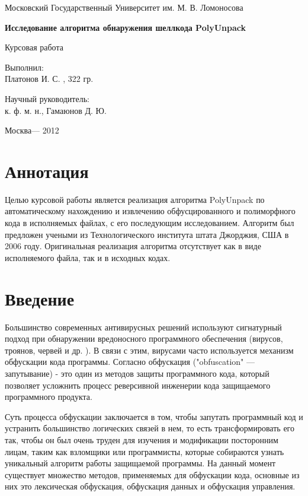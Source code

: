 \documentclass[oneside, final, 14pt]{extreport}
\begin{document}
\centerline{Московский Государственный Университет им. М. В. Ломоносова}
\centerline{\hfill\hrulefill\hrulefill\hfill}
\vfill
\vfill
\vfill
\large
\vfill
\Large
\begin{centering}
{\bf Исследование алгоритма обнаружения шеллкода PolyUnpack\\}
\end{centering}
\normalsize
\vfill
\centerline{Курсовая работа}
\vfill
\vfill
\begin{flushright}
Выполнил:\\ Платонов И. С. , 322 гр.
\end{flushright}

\begin{flushright}
Научный руководитель:\\
к. ф. м. н., Гамаюнов Д. Ю.
\end{flushright}
\vfill
\vfill
\centerline{Москва--- 2012}








\tableofcontents




\chapter{Аннотация}

Целью курсовой работы является реализация алгоритма PolyUnpack \cite{Poly} по автоматическому нахождению и извлечению обфусцированного и полиморфного кода в исполняемых файлах, с его последующим исследованием. Алгоритм был предложен учеными из Технологического института штата Джорджия, США в 2006 году.  Оригинальная реализация алгоритма отсутствует как в виде исполняемого файла, так и в исходных кодах.

\chapter{Введение}

Большинство современных антивирусных решений используют сигнатурный подход при обнаружении вредоносного программного обеспечения (вирусов, троянов, червей и др. ). В связи с этим, вирусами часто используется механизм обфускации кода программы. Согласно \cite{Obphys} обфускация ("obfuscation" — запутывание) - это один из методов защиты программного кода, который позволяет усложнить процесс реверсивной инженерии кода защищаемого программного продукта. 

Суть процесса обфускации заключается в том, чтобы запутать программный код и устранить большинство логических связей в нем, то есть трансформировать его так, чтобы он был очень труден для изучения и модификации посторонним лицам, таким как взломщики или программисты, которые собираются узнать уникальный алгоритм работы защищаемой программы. На данный момент существует множество методов, применяемых для обфускации кода, основные из них это лексическая обфускация, обфускация данных и обфускация управления. 
\end{document}
